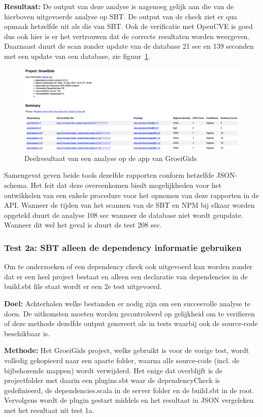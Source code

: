 \textbf{Resultaat:} De output van deze analyse is nagenoeg gelijk aan die van de hierboven uitgevoerde analyse op SBT. De output van de check ziet er qua opmaak hetzelfde uit als die van SBT. Ook de verificatie met OpenCVE is goed dus ook hier is er het vertrouwen dat de correcte resultaten worden weergeven. Daarnaast duurt de scan zonder update van de database 21 sec en 139 seconden met een update van een database, zie figuur~\ref{fig:NPMReport1b}.

\begin{figure}
    \myfloatalign
    \includegraphics[width=15cm]{gfx/report_analyse_test1b_NPM}
    \caption{Deelresultaat van een analyse op de app van GroeiGids}
    \label{fig:NPMReport1b}
\end{figure}

Samengevat geven beide tools dezelfde rapporten conform hetzelfde JSON-schema. Het feit dat deze overeenkomen biedt mogelijkheden voor het ontwikkelen van een enkele procedure voor het opnemen van deze rapporten in de API.
Wanneer de tijden van het scannen van de SBT en NPM bij elkaar worden opgeteld duurt de analyse 108 sec wanneer de database niet wordt geupdate. Wanneer dit wel het geval is duurt de test 208 sec.

\subsubsection{Test 2a: SBT alleen de dependency informatie gebruiken}
Om te onderzoeken of een dependency check ook uitgevoerd kan worden zonder dat er een heel project bestaat en alleen een declaratie van dependencies in de build.sbt file staat wordt er een 2e test uitgevoerd.

\textbf{Doel:} Achterhalen welke bestanden er nodig zijn om een succesvolle analyse te doen. De uitkomsten moeten worden gecontroleerd op gelijkheid om te verifieren of deze methode dezelfde output genereert als in tests waarbij ook de source-code beschikbaar is.


\textbf{Methode:} Het GroeiGids project, welke gebruikt is voor de vorige test, wordt volledig gekopieerd naar een aparte folder, waarna alle source-code (incl. de bijbehorende mappen) wordt verwijderd. Het enige dat overblijft is de projectfolder met daarin een plugins.sbt waar de dependencyCheck is gedefinieerd, de dependencies.scala in de server folder en de build.sbt in de root. Vervolgens wordt de plugin gestart middels  en het resultaat in JSON vergeleken met het resultaat uit test 1a.

